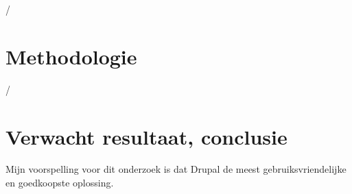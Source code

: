 /




\section{Methodologie}%
\label{sec:methodologie}

/

\section{Verwacht resultaat, conclusie}%
\label{sec:verwachte_resultaten}

Mijn voorspelling voor dit onderzoek is dat Drupal de meest gebruiksvriendelijke en goedkoopste oplossing.
